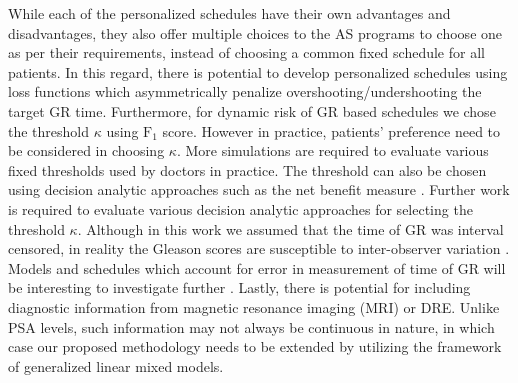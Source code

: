 While each of the personalized schedules have their own advantages and disadvantages, they also offer multiple choices to the AS programs to choose one as per their requirements, instead of choosing a common fixed schedule for all patients. In this regard, there is potential to develop personalized schedules using loss functions which asymmetrically penalize overshooting/undershooting the target GR time. Furthermore, for dynamic risk of GR based schedules we chose the threshold $\kappa$ using $\mbox{F}_1$ score. However in practice, patients' preference need to be considered in choosing $\kappa$. More simulations are required to evaluate various fixed thresholds used by doctors in practice. The threshold can also be chosen using decision analytic approaches such as the net benefit measure \citep{vickers2006decision}. Further work is required to evaluate various decision analytic approaches for selecting the threshold $\kappa$. Although in this work we assumed that the time of GR was interval censored, in reality the Gleason scores are susceptible to inter-observer variation \citep{Gleason_interobs_var}. Models and schedules which account for error in measurement of time of GR will be interesting to investigate further \citep{coley2017}. Lastly, there is potential for including diagnostic information from magnetic resonance imaging (MRI) or DRE. Unlike PSA levels, such information may not always be continuous in nature, in which case our proposed methodology needs to be extended by utilizing the framework of generalized linear mixed models.